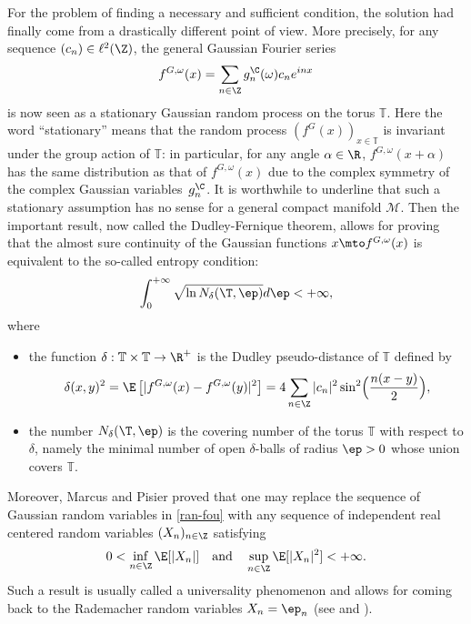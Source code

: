 For the problem of finding a necessary and sufficient condition, the solution had finally come from a drastically different point of view. More precisely, for any sequence $(c_n)\in \ell^2(\Z)$, the general Gaussian Fourier series
\begin{equation}\label{ran-fou}
f^{G,\omega}(x)=\sum_{n\in \Z} g_n^{\C}(\omega) c_n e^{inx}
\end{equation}
is now seen as a stationary Gaussian random process on the torus $\mathbb{T}$.
Here the word ``stationary'' means that the random process $(f^{G}(x))_{x\in \mathbb{T}}$ is invariant under the group action of $\mathbb{T}$: in particular, for any angle $\alpha \in \R$, $f^{G,\omega}(x+\alpha)$ has the same distribution as that of $f^{G,\omega}(x)$ due to the complex symmetry of the complex Gaussian variables~$g_n^\C$.
It is worthwhile to underline that such a stationary assumption has no sense for a general compact manifold $\mathcal{M}$.
Then the important result, now called the Dudley-Fernique theorem, allows for proving that the almost sure continuity of the Gaussian functions
$x\mto f^{G,\omega}(x)$ is equivalent to the so-called entropy condition:
\begin{equation}\label{entrop}
\int_{0}^{+\infty} \sqrt{\ln N_{\delta}(\T,\ep)} d\ep<+\infty,
\end{equation}
\enlargethispage{-2\baselineskip}%
where
\begin{itemize}
\item the function $\delta:\mathbb{T}\times \mathbb{T}\to \R^+$ is the Dudley pseudo-distance of $\mathbb{T}$ defined by\vspace*{-3pt}
\begin{equation*}
\delta(x,y)^2 =\E\left[| f^{G,\omega}(x)-f^{G,\omega}(y)|^2\right]=4\sum_{n\in \Z} |c_n|^2 \sin^2\Bigl(\frac{n(x-y)}{2}\Bigr),
\end{equation*}
\item the number $N_{\delta}(\T,\ep)$ is the covering number of the torus $\mathbb{T}$ with respect to $\delta$, namely the minimal number of open $\delta$-balls of radius $\ep>0$ whose union covers $\mathbb{T}$.
\end{itemize}
Moreover, Marcus and Pisier proved that one may replace the sequence of Gaussian random variables in \eqref{ran-fou} with any sequence of independent real centered random variables $(X_n)_{n\in \Z}$ satisfying\vspace*{-3pt}
\begin{equation*}
0<\inf_{n\in \Z}\E[|X_n|] \quad \text{and} \quad \sup_{n\in \Z} \E[|X_n|^2]<+\infty.
\end{equation*}
Such a result is usually called a universality phenomenon and allows for coming back to the Rademacher random variables $X_n=\ep_n$ (see \cite[p.\,7--9]{pisier1981} and \cite[p.\,28, Cor.\,7.3]{pisier1977}).

